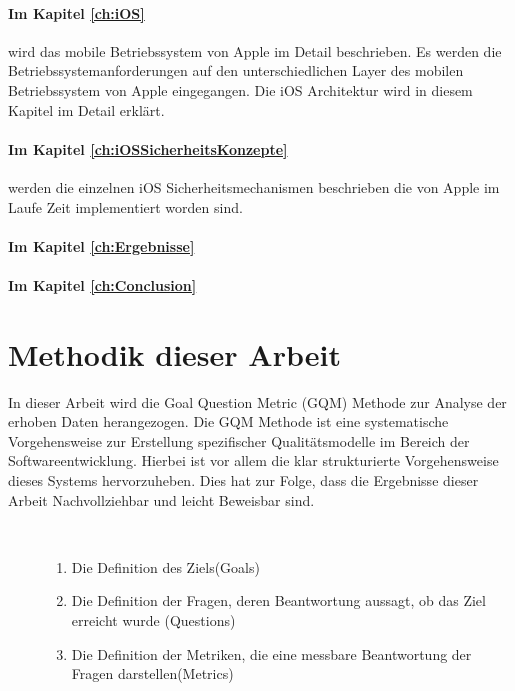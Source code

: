 \paragraph{Im Kapitel \ref{ch:iOS}} wird das mobile Betriebssystem von Apple im Detail beschrieben. Es werden die Betriebssystemanforderungen auf den unterschiedlichen Layer des mobilen Betriebssystem von Apple eingegangen. Die iOS Architektur wird in diesem Kapitel im Detail erklärt. 

\paragraph{Im Kapitel \ref{ch:iOSSicherheitsKonzepte}} werden die einzelnen iOS Sicherheitsmechanismen beschrieben die von Apple im Laufe Zeit implementiert worden sind.

\paragraph{Im Kapitel \ref{ch:Ergebnisse}}

\paragraph{Im Kapitel \ref{ch:Conclusion}}

\section{Methodik dieser Arbeit}
\label{sec:MethArbeit}
In dieser Arbeit wird die Goal Question Metric (GQM) Methode zur Analyse der erhoben Daten herangezogen. Die GQM Methode ist eine systematische Vorgehensweise zur Erstellung spezifischer Qualitätsmodelle im Bereich der Softwareentwicklung. Hierbei ist vor allem die klar strukturierte Vorgehensweise dieses Systems hervorzuheben. Dies hat zur Folge, dass die Ergebnisse dieser Arbeit Nachvollziehbar und leicht Beweisbar sind.

\begin{description}
    \item[\parbox{\textwidth} {Die GQM-Methode ist in drei Schritte unterteilt und dient zur Bewertung der erhoben Daten}]~\par
    \begin{enumerate}
        \item Die Definition des Ziels(Goals)
        \item Die Definition der Fragen, deren Beantwortung aussagt, ob das Ziel erreicht wurde (Questions)
        \item Die Definition der Metriken, die eine messbare Beantwortung der Fragen darstellen(Metrics)
    \end{enumerate}
\end{description} 

